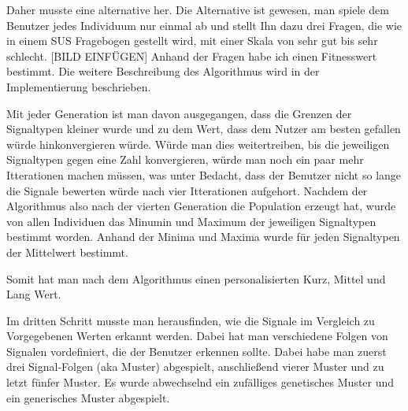 Daher musste eine alternative her. Die Alternative ist gewesen, man spiele dem Benutzer jedes Individuum nur einmal ab und stellt Ihn dazu drei Fragen, die wie in einem SUS Fragebogen gestellt wird, mit einer Skala von sehr gut bis sehr schlecht. [BILD EINFÜGEN]
Anhand der Fragen habe ich einen Fitnesswert bestimmt. Die weitere Beschreibung des Algorithmus wird in der Implementierung beschrieben.

Mit jeder Generation ist man davon ausgegangen, dass die Grenzen der Signaltypen kleiner wurde und zu dem Wert, dass dem Nutzer am besten gefallen würde hinkonvergieren würde.
 Würde man dies weitertreiben, bis die jeweiligen Signaltypen gegen eine Zahl konvergieren, würde man noch ein paar mehr Itterationen machen müssen, was unter Bedacht, dass der Benutzer nicht so lange die Signale bewerten würde nach vier Itterationen aufgehort. Nachdem der Algorithmus also nach der vierten Generation die Population erzeugt hat, wurde von allen Individuen das Minumin und Maximum der jeweiligen Signaltypen bestimmt worden. Anhand der Minima und Maxima wurde für jeden Signaltypen der Mittelwert bestimmt.

Somit hat man nach dem Algorithmus einen personalisierten Kurz, Mittel und Lang Wert.

Im dritten Schritt musste man herausfinden, wie die Signale im Vergleich zu Vorgegebenen Werten erkannt werden.
Dabei hat man verschiedene Folgen von Signalen vordefiniert, die der Benutzer erkennen sollte. Dabei habe man zuerst drei Signal-Folgen (aka Muster) abgespielt, anschließend vierer Muster und zu letzt fünfer Muster. Es wurde abwechselnd ein zufälliges genetisches Muster und ein generisches Muster abgespielt. 


